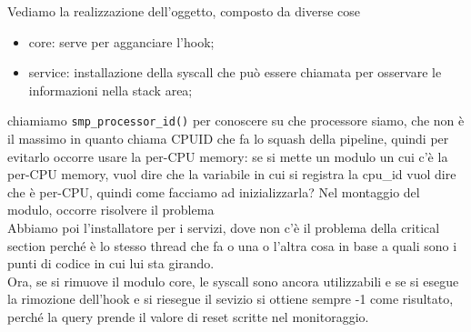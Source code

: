 \documentclass[12pt, oneside]{extbook}
\begin{document}
Vediamo la realizzazione dell'oggetto, composto da diverse cose
\begin{itemize}
\item core: serve per agganciare l'hook;
\item service: installazione della syscall che può essere chiamata per osservare le informazioni nella stack area;
\end{itemize}
chiamiamo \texttt{smp\_processor\_id()} per conoscere su che processore siamo, che non è il massimo in quanto chiama CPUID che fa lo squash della pipeline, quindi per evitarlo occorre usare la per-CPU memory: se si mette un modulo un cui c'è la per-CPU memory, vuol dire che la variabile in cui si registra la cpu\_id vuol dire che è per-CPU, quindi come facciamo ad inizializzarla? Nel montaggio del modulo, occorre risolvere il problema\\Abbiamo poi l'installatore per i servizi, dove non c'è il problema della critical section perché è lo stesso thread che fa o una o l'altra cosa in base a quali sono i punti di codice in cui lui sta girando.\\Ora, se si rimuove il modulo core, le syscall sono ancora utilizzabili e se si esegue la rimozione dell'hook e si riesegue il sevizio si ottiene sempre -1 come risultato, perché la query prende il valore di reset scritte nel monitoraggio.
\end{document}
